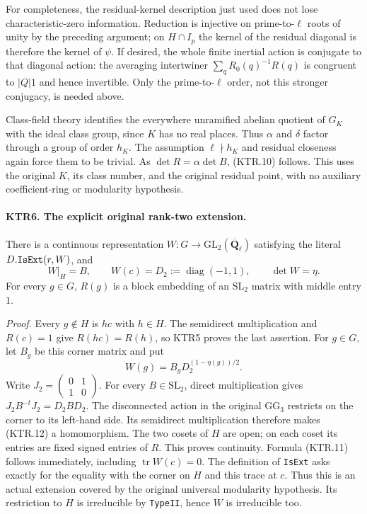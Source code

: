 \documentclass[11pt,a4paper]{article}
\numberwithin{equation}{section}
\theoremstyle{remark}\newtheorem{remark}[theorem]{Remark}
\begin{document}
For completeness, the residual-kernel description just used does
not lose characteristic-zero information.  Reduction is injective
on prime-to-\(\ell\) roots of unity by the preceding argument;
on \(H\cap I_p\) the kernel of the residual diagonal is
therefore the kernel of \(\psi\).  If desired, the whole
finite inertial action is conjugate to that diagonal action:
the averaging intertwiner
\(\sum_{q}R_0(q)^{-1}R(q)\) is congruent to \(|Q|1\)
and hence invertible.  Only the prime-to-\(\ell\) order,
not this stronger conjugacy, is needed above.

Class-field theory identifies the everywhere unramified abelian
quotient of \(G_K\) with the ideal class group, since \(K\)
has no real places.  Thus \(\alpha\) and \(\delta\)
factor through a group of order \(h_K\).  The assumption
\(\ell\nmid h_K\) and residual closeness again force them
to be trivial.  As \(\det R=\alpha\det B\), (KTR.10)
follows.  This uses the original \(K\), its class number, and
the original residual point, with no auxiliary coefficient-ring
or modularity hypothesis.

\paragraph{KTR6. The explicit original rank-two extension.}
\label{claim:KTR6}
There is a continuous representation \(W:G\to
\mathrm{GL}_2(\overline{\mathbf Q}_\ell)\) satisfying
the literal \(D.\texttt{Is\allowbreak Ext}(r,W)\), and
\[
 W|_H=B,\qquad W(c)=D_2:=\operatorname{diag}(-1,1),
 \qquad \det W=\eta.
 \tag{KTR.11}
\]
For every \(g\in G\), \(R(g)\) is a block embedding of
an \(\mathrm{SL}_2\) matrix with middle entry \(1\).

\emph{Proof.}
Every \(g\notin H\) is \(hc\) with \(h\in H\).
The semidirect multiplication and \(R(c)=1\) give
\(R(hc)=R(h)\), so KTR5 proves the last assertion.
For \(g\in G\), let \(B_g\) be this corner matrix and put
\[
 W(g)=B_gD_2^{(1-\eta(g))/2}.
 \tag{KTR.12}
\]
Write \(J_2=\left(\begin{smallmatrix}0&1\\1&0\end{smallmatrix}\right)\).
For every \(B\in\mathrm{SL}_2\), direct multiplication gives
\(J_2B^{-t}J_2=D_2BD_2\).  The disconnected action in the
original \(\mathrm{GG}_3\) restricts on the corner to its
left-hand side.  Its semidirect multiplication therefore makes
(KTR.12) a homomorphism.  The two cosets of \(H\) are open;
on each coset its entries are fixed signed entries of \(R\).
This proves continuity.  Formula (KTR.11) follows immediately,
including \(\operatorname{tr}W(c)=0\).
The definition of \texttt{Is\allowbreak Ext} asks exactly for the equality
with the corner on \(H\) and this trace at \(c\).
Thus this is an actual extension covered by the original universal
modularity hypothesis.  Its restriction to \(H\) is irreducible
by \texttt{Type\allowbreak II}, hence \(W\) is irreducible too.
\end{document}
